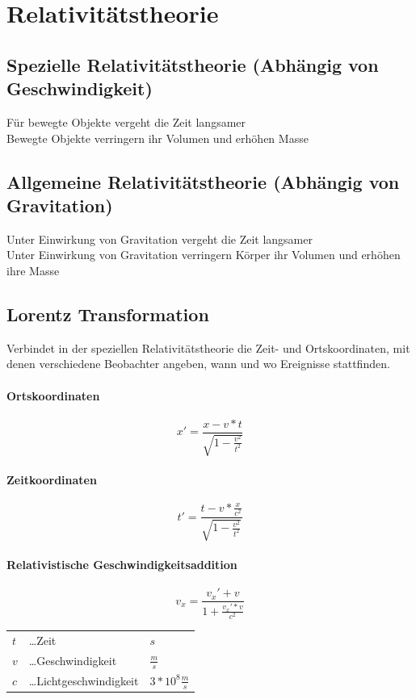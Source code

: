 \documentclass[a4paper,11pt]{article}
\begin{document}
\newpage
\section{Relativitätstheorie}
\subsection[Speziell]{Spezielle Relativitätstheorie \small{(Abhängig von Geschwindigkeit)}}
Für bewegte Objekte vergeht die Zeit langsamer\\
Bewegte Objekte verringern ihr Volumen und erhöhen Masse

\subsection[Allgemein]{Allgemeine Relativitätstheorie \small{(Abhängig von Gravitation)}}
Unter Einwirkung von Gravitation vergeht die Zeit langsamer\\
Unter Einwirkung von Gravitation verringern Körper ihr Volumen und erhöhen ihre Masse

\subsection{Lorentz Transformation}
Verbindet in der speziellen Relativitätstheorie die Zeit- und Ortskoordinaten, mit denen verschiedene Beobachter angeben, wann und wo Ereignisse stattfinden.

\paragraph{Ortskoordinaten}
$$x' = \frac{x - v * t}{\sqrt{1 - \frac{v^2}{t^2}}}$$
\paragraph{Zeitkoordinaten}
$$t' = \frac{t - v * \frac{x}{c^2}}{\sqrt{1 - \frac{v^2}{t^2}}}$$
\paragraph{Relativistische Geschwindigkeitsaddition}
$$v_x = \frac{v_x' + v}{1 + \frac{v_x' * v}{c^2}}$$

\begin{center}
    \begin{tabular}{l l l}
        $t$ &\dots Zeit & $s$\\
        $v$ &\dots Geschwindigkeit & $\frac{m}{s}$\\
        $c$ &\dots Lichtgeschwindigkeit & $3*10^8 \frac{m}{s}$
    \end{tabular}
\end{center}
\end{document}

